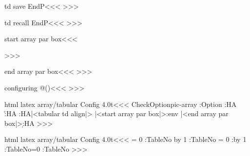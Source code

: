 \<td save EndP\><<<
\SaveEndP 
>>>

\<td recall EndP\><<<
\RecallEndP 
>>>

\<start array par box\><<<
\par  \ShowPar
>>>

\<end array par box\><<<
\IgnorePar \EndP
>>>


\<configuring @()\><<<
>>>




\<html latex array/tabular Config 4.0t\><<<
\:CheckOption{pic-array}  \if:Option \else
      {\ifvmode \IgnorePar\fi \EndP{}\putVBorder}
      {}
      {\R:HA}
      {\r:HA}
      {\D:HA|<tabular td align|>%
            |<start array par box|>\pic:env}
      {|<end array par box|>\d:HA}
\fi
>>>






\<html latex array/tabular Config 4.0t\><<<
  \let\VBorder=\empty   \let\AllColMargins=\empty
     {\let\VBorder=\empty \let\AllColMargins=\empty
      \global\let\GROUPS=\empty \HAssign\NewGroup = 0 
      \gHAdvance\Next:TableNo by 1 \global\let\TableNo=\Next:TableNo 
      \global\let\oldVBorder=\empty
     }
     {\xdef\VBorder{\VBorder\ifnum \NewGroup> 0 </colgroup>\fi}
      \HAssign\NewGroup = 0  \gdef\GROUPS{rules="groups"}%
      \gdef\oldVBorder{border="1" }%
     }
     {\Advance:\NewGroup by 1 
      \ifnum {} \xdef\VBorder{\VBorder<colgroup 
          id="TBL-\TableNo-\ar:cnt g">}\fi      
      \xdef\VBorder{\VBorder<col\Hnewline id="TBL-\TableNo
         -\ar:cnt"\xml:empty>}\xdef\AllColMargins{\AllColMargins1}}
     {\xdef\AllColMargins{\AllColMargins 0}}
\HAssign\Next:TableNo=0 \global\let\TableNo=\Next:TableNo
>>>




